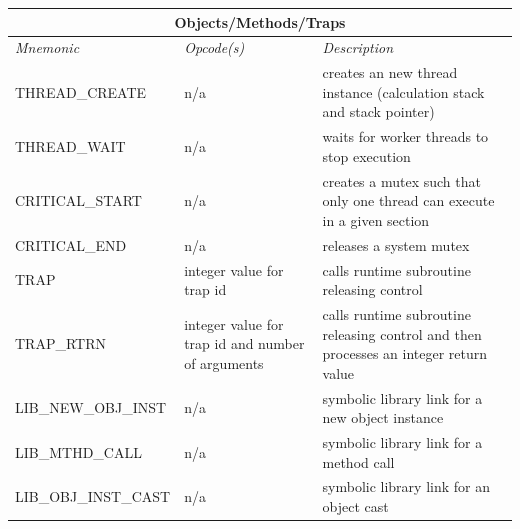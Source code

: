 \documentclass[12pt]{article}
\begin{document}
\begin{center}
  \vspace{\baselineskip}
  \begin{tabular}{| l | p{4 cm} | p{6 cm} |}
    \hline
    \multicolumn{3}{|c|}{\textbf{Objects/Methods/Traps}} \\
    \hline
    \emph{Mnemonic}  &  \emph{Opcode(s)}  &  \emph{Description} \\ \hline \hline
    THREAD\_CREATE & n/a & creates an new thread instance (calculation stack and  stack pointer) \\ \hline
    THREAD\_WAIT & n/a & waits for worker threads to stop execution \\ \hline
    CRITICAL\_START & n/a & creates a mutex such that only one thread can execute in a given section \\ \hline
    CRITICAL\_END & n/a & releases a system mutex \\ \hline
    TRAP & integer value for trap id & calls runtime subroutine releasing control \\ \hline
    TRAP\_RTRN & integer value for trap id and number of arguments &
    calls runtime subroutine releasing control and then processes an integer return value \\ \hline
    LIB\_NEW\_OBJ\_INST & n/a & symbolic library link for a new object instance  \\ \hline
    LIB\_MTHD\_CALL & n/a & symbolic library link for a method call  \\ \hline
    LIB\_OBJ\_INST\_CAST & n/a & symbolic library link for an object cast  \\ \hline
  \end{tabular}
\end{center}
\end{document}
